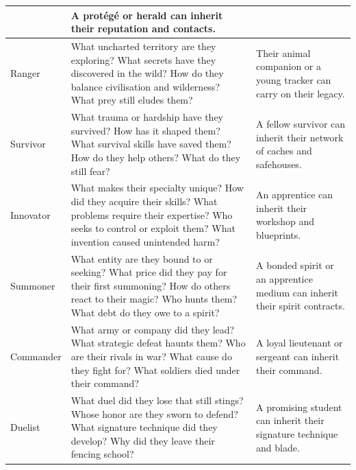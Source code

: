 \begin{longtable}{p{2.5cm} p{6.5cm} p{4cm}}
\begin{minipage}[t]{6.5cm}
\end{minipage} &
A protégé or herald can inherit their reputation and contacts. \\
\midrule
Ranger &
\begin{minipage}[t]{6.5cm}
What uncharted territory are they exploring? What secrets have they discovered in the wild? How do they balance civilisation and wilderness? What prey still eludes them?
\end{minipage} &
Their animal companion or a young tracker can carry on their legacy. \\
\midrule
Survivor &
\begin{minipage}[t]{6.5cm}
What trauma or hardship have they survived? How has it shaped them? What survival skills have saved them? How do they help others? What do they still fear?
\end{minipage} &
A fellow survivor can inherit their network of caches and safehouses. \\
\midrule
Innovator &
\begin{minipage}[t]{6.5cm}
What makes their specialty unique? How did they acquire their skills? What problems require their expertise? Who seeks to control or exploit them? What invention caused unintended harm?
\end{minipage} &
An apprentice can inherit their workshop and blueprints. \\
\midrule
Summoner &
\begin{minipage}[t]{6.5cm}
What entity are they bound to or seeking? What price did they pay for their first summoning? How do others react to their magic? Who hunts them? What debt do they owe to a spirit?
\end{minipage} &
A bonded spirit or an apprentice medium can inherit their spirit contracts. \\
\midrule
Commander &
\begin{minipage}[t]{6.5cm}
What army or company did they lead? What strategic defeat haunts them? Who are their rivals in war? What cause do they fight for? What soldiers died under their command?
\end{minipage} &
A loyal lieutenant or sergeant can inherit their command. \\
\midrule
Duelist &
\begin{minipage}[t]{6.5cm}
What duel did they lose that still stings? Whose honor are they sworn to defend? What signature technique did they develop? Why did they leave their fencing school?
\end{minipage} &
A promising student can inherit their signature technique and blade. \\

\end{longtable}
